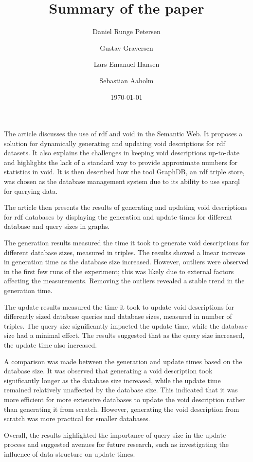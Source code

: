 \documentclass[a4paper]{article}
\title{Summary of the paper}
\date{\today}
\author{Daniel Runge Petersen \and Gustav Graversen \and Lars Emanuel Hansen \and Sebastian Aaholm}
\begin{document}
\maketitle
\thispagestyle{empty}

The article discusses the use of \gls{rdf} and \gls{void} in the Semantic Web. It proposes a solution for dynamically generating and updating \gls{void} descriptions for \gls{rdf} datasets. It also explains the challenges in keeping \gls{void} descriptions up-to-date and highlights the lack of a standard way to provide approximate numbers for statistics in \gls{void}. It is then described how the tool GraphDB, an \gls{rdf} triple store, was chosen as the database management system due to its ability to use \gls{sparql} for querying data.

The article then presents the results of generating and updating \gls{void} descriptions for \gls{rdf} databases by displaying the generation and update times for different database and query sizes in graphs.

The generation results measured the time it took to generate \gls{void} descriptions for different database sizes, measured in triples. The results showed a linear increase in generation time as the database size increased. However, outliers were observed in the first few runs of the experiment; this was likely due to external factors affecting the measurements. Removing the outliers revealed a stable trend in the generation time.

The update results measured the time it took to update \gls{void} descriptions for differently sized database queries and database sizes, measured in number of triples. The query size significantly impacted the update time, while the database size had a minimal effect. The results suggested that as the query size increased, the update time also increased.

A comparison was made between the generation and update times based on the database size. It was observed that generating a \gls{void} description took significantly longer as the database size increased, while the update time remained relatively unaffected by the database size. This indicated that it was more efficient for more extensive databases to update the \gls{void} description rather than generating it from scratch. However, generating the \gls{void} description from scratch was more practical for smaller databases.

Overall, the results highlighted the importance of query size in the update process and suggested avenues for future research, such as investigating the influence of data structure on update times.
\end{document}
